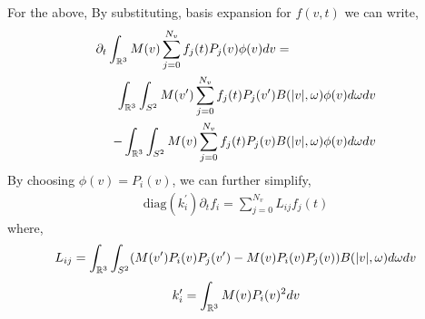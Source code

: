 \documentclass{article}
\begin{document}
For the above, By substituting, basis expansion for $f(v,t)$ we can write, 
\begin{align}
    \partial_t \int_{\mathbb{R}^3} M(v)\sum_{j=0}^{N_v} f_j(t) P_j(v) \phi(v) dv &= \\\int_{\mathbb{R}^3} \int_{S^2} M(v^\prime)\sum_{j=0}^{N_v} f_j(t) P_j(v^\prime) & B(|v|,\omega) \phi(v) d\omega dv \nonumber \\
    -\int_{\mathbb{R}^3} \int_{S^2} M(v)\sum_{j=0}^{N_v} f_j(t) P_j(v) &B(|v|,\omega) \phi(v) d\omega dv
\end{align}
By choosing $\phi(v) = P_i(v)$, we can further simplify, 
\begin{align}
    \text{diag}(k_i^\prime)\partial_t{f_i} = \sum_{j=0}^{N_v} L_{ij} f_j(t)
\end{align} where, 
\begin{equation}
    L_{ij} = \int_{\mathbb{R}^3} \int_{S^2} (M(v^\prime) P_i(v)P_j(v^\prime)  - M(v) P_i(v) P_j(v) )  B(|v|,\omega) d\omega dv
\end{equation}
\begin{equation}
    k_{i}^\prime = \int_{\mathbb{R}^3} M(v) P_i(v)^2 dv
\end{equation}
\end{document}
